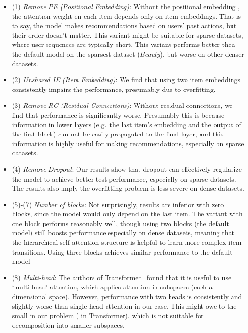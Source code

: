 \documentclass[conference]{IEEEtran}
\begin{document}
\begin{itemize}
\item (1) \emph{Remove PE (Positional Embedding)}: Without the positional embedding , the attention weight on each item 
depends only on item embeddings.
That is to say, the model makes recommendations 
based on users' past actions,
but
their order doesn't matter.
This
variant might be suitable for sparse datasets, where user sequences are typically short. This variant performs better then the default model on the sparsest dataset (\emph{Beauty}), but worse on other denser datasets.
\item (2) \emph{Unshared IE (Item Embedding)}: We 
find
that using two item embeddings consistently impairs the performance,
presumably due to overfitting.

\item (3) \emph{Remove RC (Residual Connections)}: 
Without residual connections, we find that performance is significantly worse. Presumably this is because
information in lower layers (e.g.~the last item's embedding and the output of the first block) can not be easily propagated to the final layer, and this information is highly useful for making recommendations, especially on sparse datasets.

\item (4) \emph{Remove Dropout}: Our results show that
dropout can effectively regularize the model to achieve better test performance, especially on sparse datasets. The results also imply the overfitting problem is less severe on dense datasets.

\item (5)-(7) \emph{Number of blocks}:
Not surprisingly, results are inferior
with
zero blocks, since the model would only depend on the last 
item. The variant with one block performs reasonably well, though using two blocks (the default model) still boosts performance especially on dense datasets, meaning that the hierarchical self-attention structure is helpful to learn more complex item transitions. Using three blocks achieves similar performance to the default model.

\item (8) \emph{Multi-head}: 
The authors
of Transformer~\cite{transform} found that it is useful to use `multi-head' attention, which 
applies
attention in  subspaces (each a -dimensional space). However,
performance with two heads is consistently and slightly worse than single-head attention in our case. 
This might owe
to the small  in our problem ( in Transformer), which is not suitable for decomposition into smaller subspaces.



\end{itemize}
\end{document}
